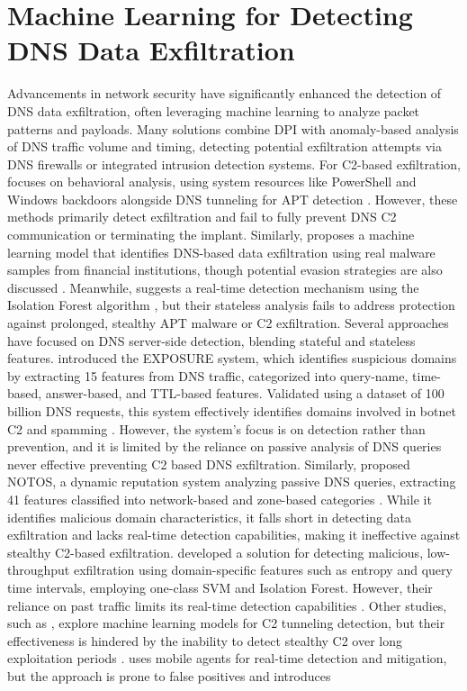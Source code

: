 \documentclass [11pt, proquest] {uwthesis}[2020/02/24]
\begin{document}
\section{Machine Learning for Detecting DNS Data Exfiltration}
Advancements in network security have significantly enhanced the detection of DNS data exfiltration, often leveraging machine learning to analyze packet patterns and payloads. Many solutions combine DPI with anomaly-based analysis of DNS traffic volume and timing, detecting potential exfiltration attempts via DNS firewalls or integrated intrusion detection systems. For C2-based exfiltration, \citeauthor{apt-process} focuses on behavioral analysis, using system resources like PowerShell and Windows backdoors alongside DNS tunneling for APT detection \cite{apt-process}. However, these methods primarily detect exfiltration and fail to fully prevent DNS  C2 communication or terminating the implant. Similarly, \citeauthor{Das} proposes a machine learning model that identifies DNS-based data exfiltration using real malware samples from financial institutions, though potential evasion strategies are also discussed \cite{Das}. Meanwhile, \citeauthor{8717806d} suggests a real-time detection mechanism using the Isolation Forest algorithm \cite{8717806d}, but their stateless analysis fails to address protection against prolonged, stealthy APT malware or C2 exfiltration. Several approaches have focused on DNS server-side detection, blending stateful and stateless features. \citeauthor{bilge2011exposure} introduced the EXPOSURE system, which identifies suspicious domains by extracting 15 features from DNS traffic, categorized into query-name, time-based, answer-based, and TTL-based features. Validated using a dataset of 100 billion DNS requests, this system effectively identifies domains involved in botnet C2 and spamming \cite{bilge2011exposure}. However, the system’s focus is on detection rather than prevention, and it is limited by the reliance on passive analysis of DNS queries never effective preventing C2 based DNS exfiltration. Similarly, \citeauthor{antonakakis2010building} proposed NOTOS, a dynamic reputation system analyzing passive DNS queries, extracting 41 features classified into network-based and zone-based categories \cite{antonakakis2010building}. While it identifies malicious domain characteristics, it falls short in detecting data exfiltration and lacks real-time detection capabilities, making it ineffective against stealthy C2-based exfiltration. \citeauthor{DBLP:journals/corr/abs-1709-08395} developed a solution for detecting malicious, low-throughput exfiltration using domain-specific features such as entropy and query time intervals, employing one-class SVM and Isolation Forest. However, their reliance on past traffic limits its real-time detection capabilities \cite{DBLP:journals/corr/abs-1709-08395}. Other studies, such as \citeauthor{10.1145/3230833.3233278}, explore machine learning models for C2 tunneling detection, but their effectiveness is hindered by the inability to detect stealthy C2 over long exploitation periods \cite{10.1145/3230833.3233278}. \citeauthor{9486400} uses mobile agents for real-time detection and mitigation, but the approach is prone to false positives and introduces 
\end{document}
